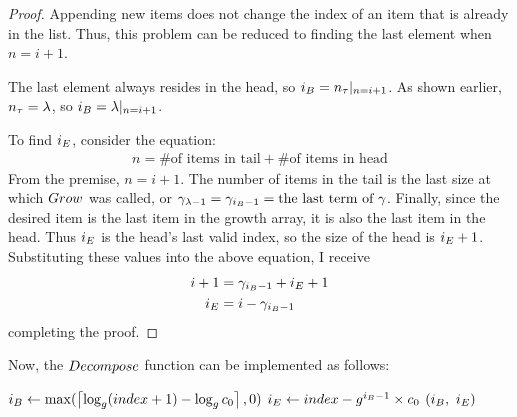 \begin{proof}
	Appending new items does not change the index of an item that is already in the list. Thus, this problem can be reduced to finding the last element when $n = i + 1$.
	
	The last element always resides in the head, so $i_B = n_\tau|_{n = i + 1}$. As shown earlier, $n_\tau = \lambda$, so $i_B = \lambda|_{n = i + 1}$.
	
	To find $i_E$, consider the equation:
	\begin{align*}
	n = \text{\# of items in tail} + \text{\# of items in head}
	\end{align*}
	From the premise, $n = i + 1$. The number of items in the tail is the last size at which $Grow$ was called, or $\gamma_{\lambda - 1} = \gamma_{i_B - 1} = \text{the last term of } \gamma$. Finally, since the desired item is the last item in the growth array, it is also the last item in the head. Thus $i_E$ is the head's last valid index, so the size of the head is $i_E + 1$. Substituting these values into the above equation, I receive
	\begin{align*}
	i + 1 &= \gamma_{i_B - 1} + i_E + 1\\
	i_E &= i - \gamma_{i_B - 1}
	\end{align*}
	completing the proof.
\end{proof}

Now, the $\FuncDecompose$ function can be implemented as follows:

\begin{algorithm}
	\begin{algorithmic}
		\Function{$\FuncDecompose$}{$\ParamIndex$}
			\State $i_B \gets \max(\left\lceil \log_{g} (index + 1) - \log_{g} c_0 \right\rceil, 0)$
			\State $i_E \gets index - g^{i_B - 1} \times c_0$
			\State \Return $(\LclIndexBuffer,\ \LclIndexElement)$
		\EndFunction
	\end{algorithmic}
\end{algorithm}


